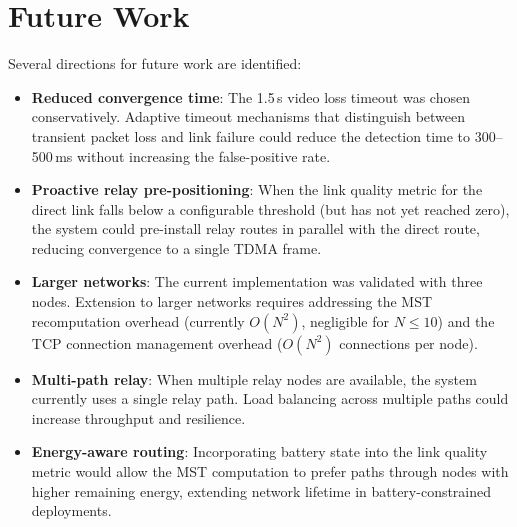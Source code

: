 \section{Future Work}
\label{sec:future}

Several directions for future work are identified:

\begin{itemize}

  \item \textbf{Reduced convergence time}: The 1.5\,s video loss timeout
  was chosen conservatively. Adaptive timeout mechanisms that distinguish
  between transient packet loss and link failure could reduce the detection
  time to 300--500\,ms without increasing the false-positive rate.

  \item \textbf{Proactive relay pre-positioning}: When the link quality metric
  for the direct link falls below a configurable threshold (but has not yet
  reached zero), the system could pre-install relay routes in parallel with
  the direct route, reducing convergence to a single TDMA frame.

  \item \textbf{Larger networks}: The current implementation was validated
  with three nodes. Extension to larger networks requires addressing the MST
  recomputation overhead (currently $O(N^2)$, negligible for $N \leq 10$) and
  the TCP connection management overhead ($O(N^2)$ connections per node).

  \item \textbf{Multi-path relay}: When multiple relay nodes are available,
  the system currently uses a single relay path. Load balancing across
  multiple paths could increase throughput and resilience.

  \item \textbf{Energy-aware routing}: Incorporating battery state into the
  link quality metric would allow the MST computation to prefer paths through
  nodes with higher remaining energy, extending network lifetime in
  battery-constrained deployments.

\end{itemize}
